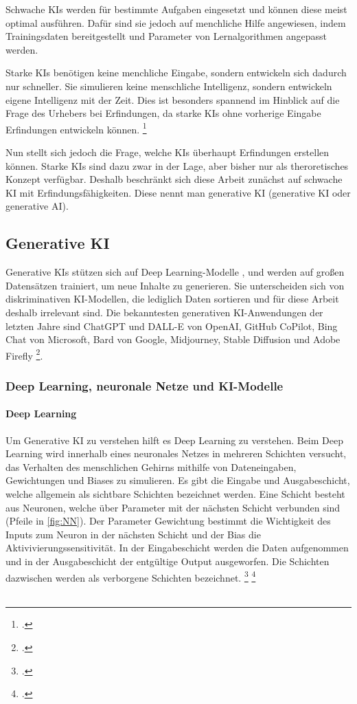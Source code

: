 Schwache KIs werden für bestimmte Aufgaben eingesetzt und 
können diese meist optimal ausführen. 
Dafür sind sie jedoch auf menchliche Hilfe angewiesen, 
indem Trainingsdaten bereitgestellt und 
Parameter von Lernalgorithmen angepasst werden.

Starke KIs benötigen keine menchliche Eingabe, 
sondern entwickeln sich dadurch nur schneller. 
Sie simulieren keine menschliche Intelligenz, 
sondern entwickeln eigene Intelligenz mit der Zeit. 
Dies ist besonders spannend im Hinblick auf die Frage 
des Urhebers bei Erfindungen, 
da starke KIs ohne vorherige Eingabe Erfindungen entwickeln können.
\footcite{WasIstStarke2023}

Nun stellt sich jedoch die Frage,
welche KIs überhaupt 
Erfindungen erstellen können. Starke KIs sind dazu zwar in 
der Lage, aber bisher nur als theroretisches Konzept verfügbar. 
Deshalb beschränkt sich diese Arbeit zunächst auf schwache KI
mit Erfindungsfähigkeiten. Diese nennt man generative KI 
(generative KI oder generative AI).

\subsection{Generative KI}
Generative KIs
stützen sich auf Deep Learning-Modelle , 
und werden auf großen Datensätzen trainiert, um neue Inhalte zu generieren.  
Sie unterscheiden sich von diskriminativen KI-Modellen, 
die lediglich Daten sortieren und für diese Arbeit deshalb irrelevant sind. 
Die bekanntesten generativen KI-Anwendungen der letzten Jahre sind
ChatGPT und DALL-E von OpenAI, GitHub CoPilot, Bing Chat von Microsoft, 
Bard von Google, Midjourney, Stable Diffusion und Adobe Firefly \footcite{WasIstGenerative}.

\subsubsection{Deep Learning, neuronale Netze und KI-Modelle}

\paragraph{Deep Learning}
Um Generative KI zu verstehen hilft es Deep Learning zu verstehen.
Beim Deep Learning wird innerhalb eines neuronales Netzes in
mehreren Schichten versucht, 
das Verhalten des menschlichen Gehirns mithilfe von Dateneingaben, 
Gewichtungen und Biases zu simulieren. 
Es gibt die Eingabe und Ausgabeschicht, 
welche allgemein als sichtbare Schichten bezeichnet werden.
Eine Schicht besteht aus Neuronen, welche über Parameter 
mit der nächsten Schicht verbunden sind (Pfeile in \ref{fig:NN}).
Der Parameter Gewichtung bestimmt die Wichtigkeit des Inputs 
zum Neuron in der nächsten Schicht und der Bias die Aktivivierungssensitivität.
In der Eingabeschicht werden die Daten aufgenommen und 
in der Ausgabeschicht der entgültige Output ausgeworfen.
Die Schichten dazwischen werden als verborgene Schichten bezeichnet.
\footcite{WasIstDeep2023}
\footcite{KuenstlicheIntelligenz}
\\
\\
